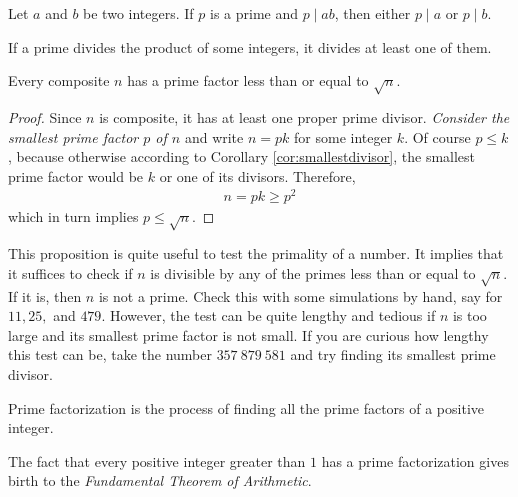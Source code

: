 \begin{proposition}\label{prop:euclidslemma}
	Let $a$ and $b$ be two integers. If $p$ is a prime and $p\mid ab$, then either $p\mid a$ or $p\mid b$.
\end{proposition}

\begin{corollary}\label{cor:euclidgeneral}
	If a prime divides the product of some integers, it divides at least one of them.
\end{corollary}

\begin{proposition}\label{factorsqrt}
	Every composite $n$ has a prime factor less than or equal to $\sqrt{n}$.
\end{proposition}

\begin{proof}
	Since $n$ is composite, it has at least one proper prime divisor. {\it Consider the smallest prime factor $p$ of $n$} and write $n=pk$ for some integer $k$. Of course $p\leq k$, because otherwise according to Corollary \eqref{cor:smallestdivisor}, the smallest prime factor would be $k$ or one of its divisors. Therefore,
	\begin{align*}
		n=pk\geq p^2
	\end{align*}
	which in turn implies $p\leq \sqrt{n}$.
\end{proof}

This proposition is quite useful to test the primality of a number. It implies that it suffices to check if $n$ is divisible by any of the primes less than or equal to $\sqrt{n}$. If it is, then $n$ is not a prime. Check this with some simulations by hand, say for $11,25,$ and $479$. However, the test can be quite lengthy and tedious if $n$ is too large and its smallest prime factor is not small. If you are curious how lengthy this test can be, take the number $357 \ 879 \ 581$ and try finding its smallest prime divisor.

\begin{definition}
	Prime factorization is the process of finding all the prime factors of a positive integer.
\end{definition}

The fact that every positive integer greater than $1$ has a prime factorization gives birth to the \textit{Fundamental Theorem of Arithmetic}.

